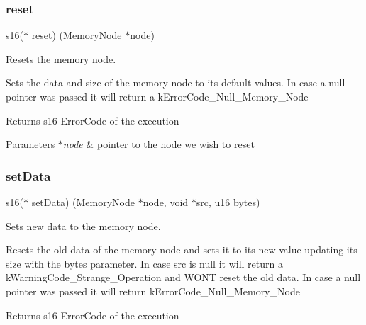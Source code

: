 \subsubsection{\texorpdfstring{reset}{reset}}
{\footnotesize\ttfamily s16($\ast$ reset) (\hyperlink{structmemory__node__s}{Memory\+Node} $\ast$node)}



Resets the memory node. 

Sets the data and size of the memory node to it\textquotesingle{}s default values. In case a null pointer was passed it will return a k\+Error\+Code\+\_\+\+Null\+\_\+\+Memory\+\_\+\+Node

\begin{DoxyReturn}{Returns}
s16 Error\+Code of the execution 
\end{DoxyReturn}

\begin{DoxyParams}{Parameters}
{\em $\ast$node} & pointer to the node we wish to reset \\
\hline
\end{DoxyParams}
\mbox{\label{structmemory__node__ops__s_aff8c997e02012501200e0794fbaf4aee}} 
\subsubsection{\texorpdfstring{set\+Data}{setData}}
{\footnotesize\ttfamily s16($\ast$ set\+Data) (\hyperlink{structmemory__node__s}{Memory\+Node} $\ast$node, void $\ast$src, u16 bytes)}



Sets new data to the memory node. 

Resets the old data of the memory node and sets it to it\textquotesingle{}s new value updating it\textquotesingle{}s size with the bytes parameter. In case src is null it will return a k\+Warning\+Code\+\_\+\+Strange\+\_\+\+Operation and W\+ON\textquotesingle{}T reset the old data. In case a null pointer was passed it will return k\+Error\+Code\+\_\+\+Null\+\_\+\+Memory\+\_\+\+Node

\begin{DoxyReturn}{Returns}
s16 Error\+Code of the execution 
\end{DoxyReturn}

